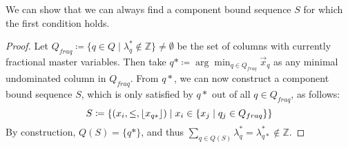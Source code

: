 We can show that we can always find a component bound sequence $S$ for which the first condition holds.

\begin{proof}\label{pr:cg_bp_bp}
Let $Q_{fraq} \coloneqq \{ q \in Q \mid \lambda_q^* \not\in \mathbb{Z} \} \neq \emptyset$ be the set of columns with currently fractional master variables. Then take $q* \coloneqq \arg\min_{q \in Q_{fraq}} \vec{x}_q$ as any minimal undominated column in $Q_{fraq}$.
From $q*$, we can now construct a component bound sequence $S$, which is only satisfied by $q*$ out of all $q \in Q_{fraq}$, as follows:
\begin{equation}
S \coloneqq \left\{ \left( x_i, \leq, \lfloor x_{q*}\rfloor \right) \mid x_i \in \{x_j \mid q_j \in Q_{fraq}\} \right\}
\end{equation}
By construction, $Q(S) = \{q*\}$, and thus $\sum_{q \in Q(S)} \lambda_q^* = \lambda_{q*}^* \not\in \mathbb{Z}$.
\end{proof}

